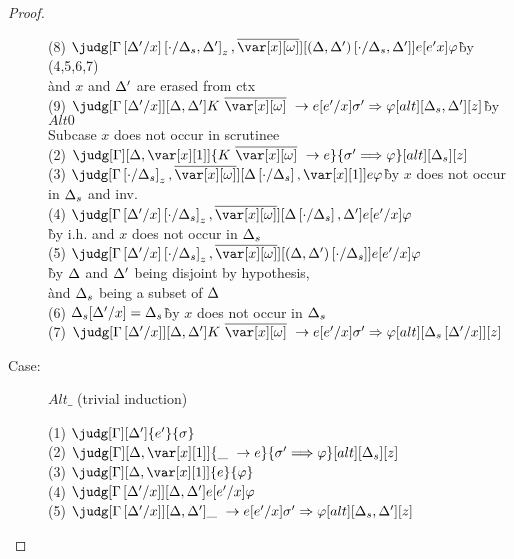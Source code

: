 \begin{proof}
\begin{description}
\begin{tabbing}
    (8) $\judg[\subst{\subst{\G}{\D'}{x}}{\cdot}{\D_s,\D'}_z,\ov{\xo}][\subst{(\D,\D')}{\cdot}{\D_s,\D'}]{e[e'x]}{\vp}$\` by (4,5,6,7)\\\` and $x$ and $\Delta'$ are erased from ctx\\
    (9) $\judg[\subst{\G}{\D'}{x}][\D,\D']{K~\ov{\xo}~\to e[e'/x]}{\s' \Rightarrow \vp}[alt][\D_s,\D'][z]$\` by $Alt0$\\
  Subcase $x$ does not occur in scrutinee\\
    (2) $\judg[\G][\D,\xl]{K~\ov{\xo}~\to e}{\s' \Longrightarrow \vp}[alt][\D_s][z]$\\
    (3) $\judg[\subst{\G}{\cdot}{\D_s}_z,\ov{\xo}][\subst{\D}{\cdot}{\D_s},\xl]{e}{\vp}$\`by $x$ does not occur in $\Delta_s$ and inv.\\
    (4) $\judg[\subst{\subst{\G}{\D'}{x}}{\cdot}{\D_s}_z,\ov{\xo}][\subst{\D}{\cdot}{\D_s},\D']{e[e'/x]}{\vp}$\\\`by i.h. and $x$ does not occur in $\Delta_s$\\
    (5) $\judg[\subst{\subst{\G}{\D'}{x}}{\cdot}{\D_s}_z,\ov{\xo}][\subst{(\D,\D')}{\cdot}{\D_s}]{e[e'/x]}{\vp}$\\
    \`by $\Delta$ and $\Delta'$ being disjoint by hypothesis,\\
    \`and $\Delta_s$ being a subset of $\Delta$\\ %
    (6) $\Delta_s[\Delta'/x] = \Delta_s$\`by $x$ does not occur in $\Delta_s$\\
    (7) $\judg[\subst{\G}{\D'}{x}][\D,\D']{K~\ov{\xo}~\to e[e'/x]}{\s' \Rightarrow \vp}[alt][\subst{\D_s}{\D'}{x}][z]$\\
\end{tabbing}

\item[Case:] $Alt\_$ (trivial induction)
\begin{tabbing}
    (1) $\judg[\G][\D']{e'}{\s}$\\
    (2) $\judg[\G][\D,\xl]{\_~\to e}{\s' \Longrightarrow \vp}[alt][\D_s][z]$\\
    (3) $\judg[\G][\D,\xl]{e}{\vp}$\\
    (4) $\judg[\subst{\G}{\D'}{x}][\D,\D']{e[e'/x]}{\vp}$\\
    (5) $\judg[\subst{\G}{\D'}{x}][\D,\D']{\_~\to e[e'/x]}{\s' \Rightarrow \vp}[alt][\D_s,\D'][z]$\\
\end{tabbing}

\end{description}

\end{proof}


